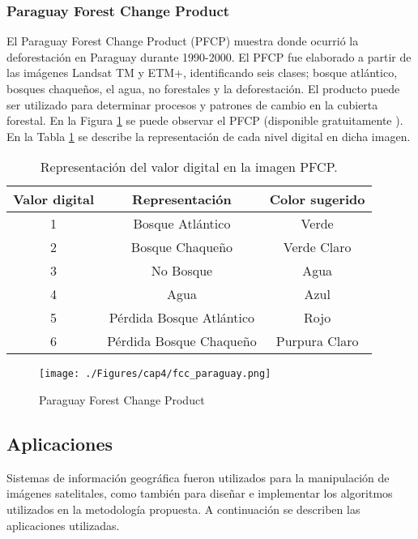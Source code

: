 \subsubsection{Paraguay Forest Change Product}\label{sec:fcc}
El Paraguay Forest Change Product (PFCP) muestra donde ocurri\'o la deforestaci\'on en Paraguay durante 1990-2000. El PFCP fue elaborado a partir de las im\'agenes Landsat TM y ETM+, identificando seis clases; bosque atl\'antico, bosques chaque\~{n}os, el agua, no forestales y la deforestaci\'on. El producto puede ser utilizado para determinar procesos y patrones de cambio en la cubierta forestal. En la Figura \ref{fig:fcc} se puede observar el PFCP (disponible gratuitamente \cite{gl2015Uni}). En la Tabla \ref{t:pfcptab} se describe la representaci\'on de cada nivel digital en dicha imagen.
\begin{table}[htbp]\centering
\begin{tabular}{|c|c|c|}
	\hline \textbf{Valor digital} &\textbf{ Representaci\'on} & \textbf{Color sugerido} \\ 
	\hline 1 & Bosque Atl\'antico & Verde \\ 
	\hline 2 & Bosque Chaque\~{n}o & Verde Claro \\ 
	\hline 3 & No Bosque & Agua \\ 
	\hline 4 & Agua & Azul \\ 
	\hline 5 & P\'erdida Bosque Atl\'antico & Rojo \\ 
	\hline 6 & P\'erdida Bosque Chaque\~{n}o & Purpura Claro \\ 
	\hline 
\end{tabular} 
\caption{Representaci\'on del valor digital en la imagen PFCP.}
\label{t:pfcptab}
\end{table}

\begin{figure}[H]
	\centering
	\texttt{[image: ./Figures/cap4/fcc\_paraguay.png]}
	\caption{Paraguay Forest Change Product}
	\label{fig:fcc}
\end{figure}



\subsection{Aplicaciones}
Sistemas de informaci\'on geogr\'afica fueron utilizados para la manipulaci\'on de im\'agenes satelitales, como tambi\'en para dise\~{n}ar e implementar los algoritmos utilizados en la metodolog\'ia propuesta. A continuaci\'on se describen las aplicaciones utilizadas.

